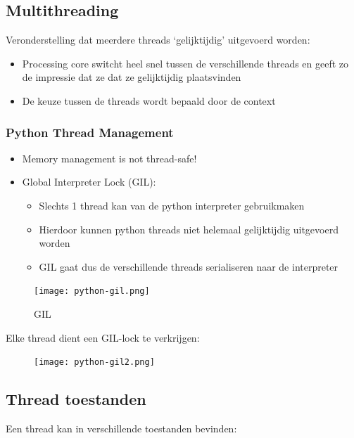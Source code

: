 \documentclass{article}
\begin{document}
\subsection{Multithreading}

Veronderstelling dat meerdere threads `gelijktijdig' uitgevoerd worden:

\begin{itemize}
    \item Processing core switcht heel snel tussen de verschillende threads en geeft zo de impressie dat ze dat ze gelijktijdig plaatsvinden
    \item De keuze tussen de threads wordt bepaald door de context
\end{itemize}

\subsubsection{Python Thread Management}

\begin{itemize}
    \item Memory management is not thread-safe!
    \item Global Interpreter Lock (GIL):
    \begin{itemize}
        \item Slechts 1 thread kan van de python interpreter gebruikmaken
        \item Hierdoor kunnen python threads niet helemaal gelijktijdig uitgevoerd worden
        \item GIL gaat dus de verschillende threads serialiseren naar de interpreter
    \end{itemize}
\end{itemize}

\begin{figure}[H]
    \centering
    \texttt{[image: python-gil.png]}
    \caption{GIL}
\end{figure}

Elke thread dient een GIL-lock te verkrijgen:

\begin{figure}[H]
    \centering
    \texttt{[image: python-gil2.png]}
\end{figure}

\subsection{Thread toestanden}

Een thread kan in verschillende toestanden bevinden:
\end{document}
